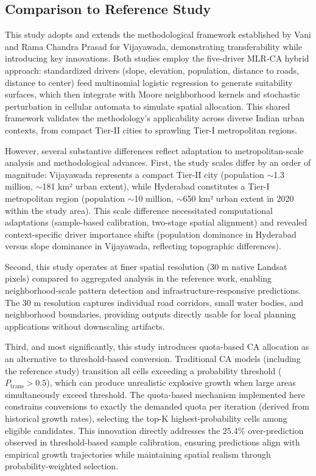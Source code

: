 \documentclass[conference]{IEEEtran}
\begin{document}
\subsection{Comparison to Reference Study}

This study adopts and extends the methodological framework established by Vani and Rama Chandra Prasad \cite{vani2022} for Vijayawada, demonstrating transferability while introducing key innovations. Both studies employ the five-driver MLR-CA hybrid approach: standardized drivers (slope, elevation, population, distance to roads, distance to center) feed multinomial logistic regression to generate suitability surfaces, which then integrate with Moore neighborhood kernels and stochastic perturbation in cellular automata to simulate spatial allocation. This shared framework validates the methodology's applicability across diverse Indian urban contexts, from compact Tier-II cities to sprawling Tier-I metropolitan regions.

However, several substantive differences reflect adaptation to metropolitan-scale analysis and methodological advances. First, the study scales differ by an order of magnitude: Vijayawada represents a compact Tier-II city (population $\sim$1.3 million, $\sim$181 km² urban extent), while Hyderabad constitutes a Tier-I metropolitan region (population $\sim$10 million, $\sim$650 km² urban extent in 2020 within the study area). This scale difference necessitated computational adaptations (sample-based calibration, two-stage spatial alignment) and revealed context-specific driver importance shifts (population dominance in Hyderabad versus slope dominance in Vijayawada, reflecting topographic differences).

Second, this study operates at finer spatial resolution (30 m native Landsat pixels) compared to aggregated analysis in the reference work, enabling neighborhood-scale pattern detection and infrastructure-responsive predictions. The 30 m resolution captures individual road corridors, small water bodies, and neighborhood boundaries, providing outputs directly usable for local planning applications without downscaling artifacts.

Third, and most significantly, this study introduces quota-based CA allocation as an alternative to threshold-based conversion. Traditional CA models (including the reference study) transition all cells exceeding a probability threshold ($P_{\text{trans}} > 0.5$), which can produce unrealistic explosive growth when large areas simultaneously exceed threshold. The quota-based mechanism implemented here constrains conversions to exactly the demanded quota per iteration (derived from historical growth rates), selecting the top-K highest-probability cells among eligible candidates. This innovation directly addresses the 25.4\% over-prediction observed in threshold-based sample calibration, ensuring predictions align with empirical growth trajectories while maintaining spatial realism through probability-weighted selection.
\end{document}
